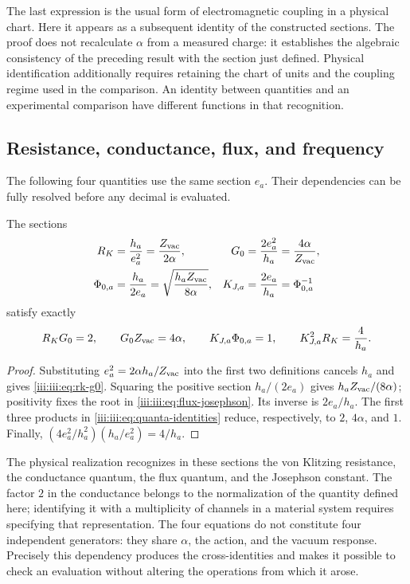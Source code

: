 The last expression is the usual form of electromagnetic coupling
in a physical chart. Here it appears as a subsequent identity of the constructed
sections. The proof does not recalculate $\alpha$ from a measured
charge: it establishes the algebraic consistency of the preceding result with the
section just defined. Physical identification additionally requires
retaining the chart of units and the coupling regime used in the
comparison. An identity between quantities and an experimental comparison
have different functions in that recognition.

\subsection{Resistance, conductance, flux, and frequency}

The following four quantities use the same section $e_a$. Their
dependencies can be fully resolved before any decimal is evaluated.

\begin{theorem}
The sections
\begin{align}
 R_K&=\frac{h_a}{e_a^2}=\frac{Z_{\rm vac}}{2\alpha},
 &G_0&=\frac{2e_a^2}{h_a}=\frac{4\alpha}{Z_{\rm vac}},
 \label{iii:iii:eq:rk-g0}\\
 \Phi_{0,a}&=\frac{h_a}{2e_a}
 =\sqrt{\frac{h_aZ_{\rm vac}}{8\alpha}},
 &K_{J,a}&=\frac{2e_a}{h_a}=\Phi_{0,a}^{-1}
 \label{iii:iii:eq:flux-josephson}
\end{align}
satisfy exactly
\begin{equation}
 R_KG_0=2,\qquad G_0Z_{\rm vac}=4\alpha,\qquad
 K_{J,a}\Phi_{0,a}=1,\qquad
 K_{J,a}^{2}R_K=\frac4{h_a}.
 \label{iii:iii:eq:quanta-identities}
\end{equation}
\end{theorem}
\begin{proof}
Substituting $e_a^2=2\alpha h_a/Z_{\rm vac}$ into the first two
definitions cancels $h_a$ and gives \eqref{iii:iii:eq:rk-g0}. Squaring
the positive section $h_a/(2e_a)$ gives
$h_aZ_{\rm vac}/(8\alpha)$; positivity fixes the root in
\eqref{iii:iii:eq:flux-josephson}. Its inverse is $2e_a/h_a$.
The first three products in \eqref{iii:iii:eq:quanta-identities}
reduce, respectively, to $2$, $4\alpha$, and $1$. Finally,
$(4e_a^2/h_a^2)(h_a/e_a^2)=4/h_a$.
\end{proof}

The physical realization recognizes in these sections the von
Klitzing resistance, the conductance quantum, the flux quantum, and the
Josephson constant. The factor $2$ in the conductance belongs to the normalization
of the quantity defined here; identifying it with a multiplicity of
channels in a material system requires specifying that representation.
The four equations do not constitute four independent generators:
they share $\alpha$, the action, and the vacuum response. Precisely this
dependency produces the cross-identities and makes it possible to check an
evaluation without altering the operations from which it arose.

